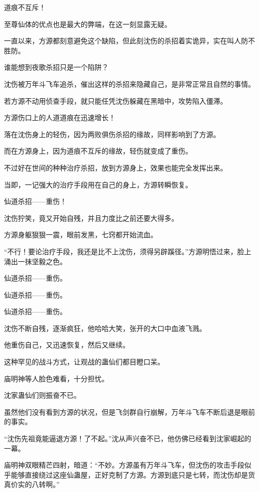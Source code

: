 
\begin{this_body}



道痕不互斥！

至尊仙体的优点也是最大的弊端，在这一刻显露无疑。

一直以来，方源都刻意避免这个缺陷，但此刻沈伤的杀招着实诡异，实在叫人防不胜防。

谁能想到夜歌杀招只是一个陷阱？

沈伤被万年斗飞车追杀，催出这样的杀招来隐藏自己，是非常正常且自然的事情。

若方源不动用侦查手段，就只能任凭沈伤躲藏在黑暗中，攻势陷入僵滞。

方源伤口上的人道道痕在迅速增长！

落在沈伤身上的轻伤，因为两败俱伤杀招的缘故，同样影响到了方源。

而在方源身上，因为道痕不互斥的缘故，轻伤就变成了重伤。

不过好在世间的种种治疗杀招，放到方源身上，效果也能完全发挥出来。

当即，一记强大的治疗手段用在自己的身上，方源转瞬恢复。

仙道杀招——重伤！

沈伤狞笑，竟又开始自残，并且力度比之前还要大得多。

方源身躯狠狠一震，眼前发黑，七窍都开始流血。

“不行！要论治疗手段，我还是比不上沈伤，须得另辟蹊径。”方源明悟过来，脸上涌出一抹坚毅之色。

仙道杀招——重伤。

仙道杀招——重伤。

仙道杀招——重伤。

沈伤不断自残，逐渐疯狂，他哈哈大笑，张开的大口中血液飞溅。

他重伤自己，又迅速恢复，然后又继续。

这种罕见的战斗方式，让观战的蛊仙们都目瞪口呆。

庙明神等人脸色难看，十分担忧。

沈家蛊仙们则振奋不已。

虽然他们没有看到方源的状况，但是飞剑群自行崩解，万年斗飞车不断后退是眼前的事实。

“沈伤先祖竟能逼退方源！了不起。”沈从声兴奋不已，他仿佛已经看到沈家崛起的一幕。

庙明神双眼精芒四射，暗道：“不妙。方源虽有万年斗飞车，但沈伤的攻击手段似乎能够直接绕过这座仙蛊屋，正好克制了方源。方源到底只是七转，而沈伤却是货真价实的八转啊。”


\end{this_body}
